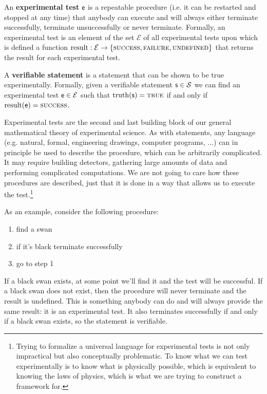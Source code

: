 \documentclass[11pt,letterpaper,fleqn]{memoir} %
\begin{document}
\begin{mathSection}
\begin{axiom}\label{def_experimental_tests}
	An \textbf{experimental test} $\mathsf{e}$ is a repeatable procedure (i.e. it can be restarted and stopped at any time) that anybody can execute and will always either terminate successfully, terminate unsuccessfully or never terminate. Formally, an experimental test is an element of the set $\mathcal{E}$ of all experimental tests upon which is defined a function $\operatorname{result}: \mathcal{E} \to \{\textsc{success}, \textsc{failure}, \textsc{undefined}\}$ that returns the result for each experimental test.
\end{axiom}
\begin{defn}
	A \textbf{verifiable statement} is a statement that can be shown to be true experimentally. Formally, given a verifiable statement $\mathsf{s} \in \mathcal{S}$ we can find an experimental test $\mathsf{e} \in \mathcal{E}$ such that $\operatorname{truth}(\mathsf{s})=\textsc{true}$ if and only if $\operatorname{result}(\mathsf{e})=\textsc{success}$.
\end{defn}
\end{mathSection}

Experimental tests are the second and last building block of our general mathematical theory of experimental science. As with statements, any language (e.g. natural, formal, engineering drawings, computer programs, ...) can in principle be used to describe the procedure, which can be arbitrarily complicated. It may require building detectors, gathering large amounts of data and performing complicated computations. We are not going to care how these procedures are described, just that it is done in a way that allows us to execute the test.\footnote{Trying to formalize a universal language for experimental tests is not only impractical but also conceptually problematic. To know what we can test experimentally is to know what is physically possible, which is equivalent to knowing the laws of physics, which is what we are trying to construct a framework for.}

As an example, consider the following procedure:
\begin{enumerate}
	\item find a swan
	\item if it's black terminate successfully
	\item go to step 1
\end{enumerate}
If a black swan exists, at some point we'll find it and the test will be successful. If a black swan does not exist, then the procedure will never terminate and the result is undefined. This is something anybody can do and will always provide the same result: it is an experimental test. It also terminates successfully if and only if a black swan exists, so the statement  is verifiable.
\end{document}
